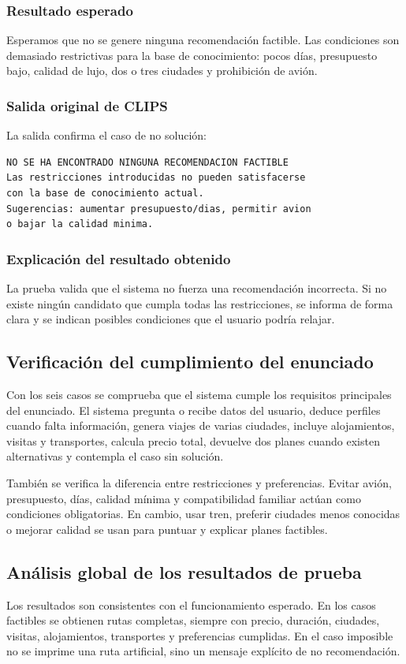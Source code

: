 \documentclass[11pt,a4paper]{article}
\begin{document}
\subsubsection{Resultado esperado}
Esperamos que no se genere ninguna recomendaci\'on factible. Las condiciones son
demasiado restrictivas para la base de conocimiento: pocos d\'ias, presupuesto
bajo, calidad de lujo, dos o tres ciudades y prohibici\'on de avi\'on.

\subsubsection{Salida original de CLIPS}
La salida confirma el caso de no soluci\'on:
\begin{verbatim}
NO SE HA ENCONTRADO NINGUNA RECOMENDACION FACTIBLE
Las restricciones introducidas no pueden satisfacerse
con la base de conocimiento actual.
Sugerencias: aumentar presupuesto/dias, permitir avion
o bajar la calidad minima.
\end{verbatim}

\subsubsection{Explicaci\'on del resultado obtenido}
La prueba valida que el sistema no fuerza una recomendaci\'on incorrecta. Si no
existe ning\'un candidato que cumpla todas las restricciones, se informa de
forma clara y se indican posibles condiciones que el usuario podr\'ia relajar.

\subsection{Verificaci\'on del cumplimiento del enunciado}
Con los seis casos se comprueba que el sistema cumple los requisitos principales
del enunciado. El sistema pregunta o recibe datos del usuario, deduce perfiles
cuando falta informaci\'on, genera viajes de varias ciudades, incluye
alojamientos, visitas y transportes, calcula precio total, devuelve dos planes
cuando existen alternativas y contempla el caso sin soluci\'on.

Tambi\'en se verifica la diferencia entre restricciones y preferencias. Evitar
avi\'on, presupuesto, d\'ias, calidad m\'inima y compatibilidad familiar act\'uan
como condiciones obligatorias. En cambio, usar tren, preferir ciudades menos
conocidas o mejorar calidad se usan para puntuar y explicar planes factibles.

\subsection{An\'alisis global de los resultados de prueba}
Los resultados son consistentes con el funcionamiento esperado. En los casos
factibles se obtienen rutas completas, siempre con precio, duraci\'on, ciudades,
visitas, alojamientos, transportes y preferencias cumplidas. En el caso
imposible no se imprime una ruta artificial, sino un mensaje expl\'icito de no
recomendaci\'on.
\end{document}
